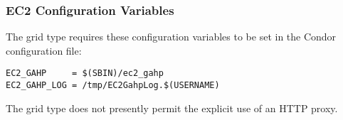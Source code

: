 \subsubsection{\label{sec:Amazon-config}EC2 Configuration Variables}

The  grid type requires these configuration variables 
to be set in the Condor configuration file:

\footnotesize
\begin{verbatim}
EC2_GAHP     = $(SBIN)/ec2_gahp
EC2_GAHP_LOG = /tmp/EC2GahpLog.$(USERNAME)
\end{verbatim}
\normalsize

The  grid type does not presently permit the explicit use 
of an HTTP proxy.
